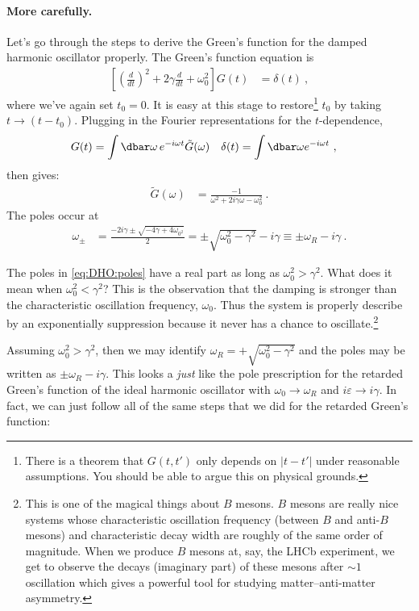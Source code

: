  \paragraph{More carefully.} Let's go through the steps to derive the Green's function for the damped harmonic oscillator properly. The Green's function equation is
 \begin{align}
  \left[
  \left(\frac{d}{dt}\right)^2
  + 2\gamma \frac{d}{dt}
  + \omega_0^2
  \right]
  G(t)
  &=
  \delta(t) \ ,
 \end{align}
 where we've again set $t_0 = 0$. It is easy at this stage to restore\footnote{There is a theorem that $G(t,t')$ only depends on $|t-t'|$ under reasonable assumptions. You should be able to argue this on physical grounds.} $t_0$ by taking $t\to (t-t_0)$. Plugging in the Fourier representations for the $t$-dependence,
 \begin{align}
  G(t) &= \int \dbar \omega \, e^{-i\omega t}\tilde G(\omega)
  &
  \delta(t) &= \int \dbar \omega e^{-i\omega t} \ ,
 \end{align}
 then gives:
 \begin{align}
  \tilde G(\omega) &=
  \frac{-1}{\omega^2+2i\gamma\omega -\omega_0^2} \ .
 \end{align}
 The poles occur at 
 \begin{align}
  \omega_\pm &= \frac{-2i\gamma \pm \sqrt{-4\gamma + 4\omega_{0^2}}}{2}
  = \pm \sqrt{\omega_0^2 - \gamma^2} - i \gamma \equiv \pm \omega_R - i\gamma\ .
  \label{eq:DHO:poles}
 \end{align}
 \begin{example}
 The poles in \eqref{eq:DHO:poles} have a real part as long as $\omega_0^2 > \gamma^2$. What does it mean when $\omega_0^2 < \gamma^2$? This is the observation that the damping is stronger than the characteristic oscillation frequency, $\omega_0$. Thus the system is properly describe by an exponentially suppression because it never has a chance to oscillate.\footnote{This is one of the magical things about $B$ mesons. $B$ mesons are really nice systems whose characteristic oscillation frequency (between $B$ and anti-$B$ mesons) and characteristic decay width are roughly of the same order of magnitude. When we produce $B$ mesons at, say, the LHCb experiment, we get to observe the decays (imaginary part) of these mesons after $\sim 1$ oscillation which gives a powerful tool for studying matter--anti-matter asymmetry.\label{footnote:B:meson}}
 \end{example}
 Assuming $\omega_0^2 > \gamma^2$, then we may identify $\omega_R = +\sqrt{\omega_0^2 - \gamma^2}$ and the poles may be written as $\pm \omega_R - i\gamma$. This looks a \emph{just} like the pole prescription for the retarded Green's function of the ideal harmonic oscillator with $\omega_0\to \omega_R$ and $i\varepsilon\to i\gamma$. In fact, we can just follow all of the same steps that we did for the retarded Green's function:
